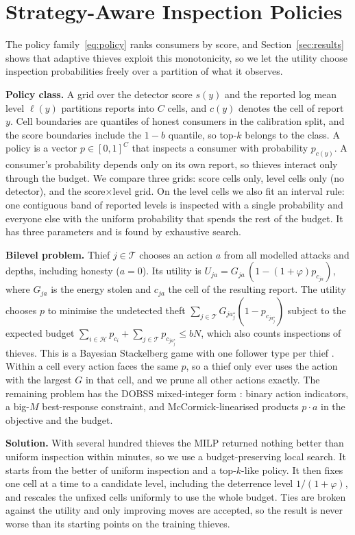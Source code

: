 \documentclass[journal]{IEEEtran}
\begin{document}
\section{Strategy-Aware Inspection Policies}\label{sec:strategic}
The policy family~\eqref{eq:policy} ranks consumers by score, and Section~\ref{sec:results} shows that adaptive thieves exploit this monotonicity, so we let the utility choose inspection probabilities freely over a partition of what it observes.

\textbf{Policy class.} A grid over the detector score $s(y)$ and the reported log mean level $\ell(y)$ partitions reports into $C$ cells, and $c(y)$ denotes the cell of report $y$. Cell boundaries are quantiles of honest consumers in the calibration split, and the score boundaries include the $1-b$ quantile, so top-$k$ belongs to the class. A policy is a vector $p\in[0,1]^C$ that inspects a consumer with probability $p_{c(y)}$. A consumer's probability depends only on its own report, so thieves interact only through the budget. We compare three grids: score cells only, level cells only (no detector), and the score$\times$level grid. On the level cells we also fit an interval rule: one contiguous band of reported levels is inspected with a single probability and everyone else with the uniform probability that spends the rest of the budget. It has three parameters and is found by exhaustive search.

\textbf{Bilevel problem.} Thief $j\in\mathcal T$ chooses an action $a$ from all modelled attacks and depths, including honesty ($a=0$). Its utility is $U_{ja}=G_{ja}\,(1-(1+\varphi)p_{c_{ja}})$, where $G_{ja}$ is the energy stolen and $c_{ja}$ the cell of the resulting report. The utility chooses $p$ to minimise the undetected theft $\sum_{j\in\mathcal T} G_{ja_j^\star}(1-p_{c_{ja_j^\star}})$ subject to the expected budget $\sum_{i\in\mathcal H}p_{c_i}+\sum_{j\in\mathcal T} p_{c_{ja_j^\star}}\le bN$, which also counts inspections of thieves. This is a Bayesian Stackelberg game with one follower type per thief \cite{conitzer2006,paruchuri2008}. Within a cell every action faces the same $p$, so a thief only ever uses the action with the largest $G$ in that cell, and we prune all other actions exactly. The remaining problem has the DOBSS mixed-integer form \cite{paruchuri2008}: binary action indicators, a big-$M$ best-response constraint, and McCormick-linearised products $p\cdot a$ in the objective and the budget.

\textbf{Solution.} With several hundred thieves the MILP returned nothing better than uniform inspection within minutes, so we use a budget-preserving local search. It starts from the better of uniform inspection and a top-$k$-like policy. It then fixes one cell at a time to a candidate level, including the deterrence level $1/(1+\varphi)$, and rescales the unfixed cells uniformly to use the whole budget. Ties are broken against the utility and only improving moves are accepted, so the result is never worse than its starting points on the training thieves.
\end{document}
